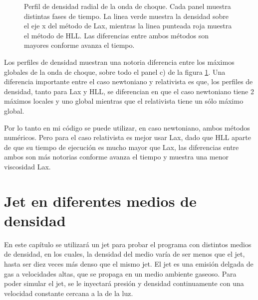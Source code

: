 \documentclass[12pt,a4paper]{book}
\begin{document}
\begin{figure}
\caption{\label{fig:perfil_de_densidad_radial_relativista}Perfil de densidad radial de la onda de choque. Cada panel muestra distintas fases de tiempo. La linea verde muestra la densidad sobre el eje x del método de Lax, mientras la linea punteada roja muestra el método de HLL. Las diferencias entre ambos métodos son mayores conforme avanza el tiempo.}
\end{figure}

Los perfiles de densidad muestran una notoria diferencia entre los máximos globales de la onda de choque, sobre todo el panel c) de la figura \ref{fig:perfil_de_densidad_radial_relativista}. Una diferencia importante entre el caso newtoniano y relativista es que, los perfiles de densidad, tanto para Lax y HLL, se diferencian en que el caso newtoniano tiene 2 máximos locales y uno global mientras que el relativista tiene un sólo máximo global.

Por lo tanto en mi código se puede utilizar, en caso newtoniano, ambos métodos numéricos. Pero para el caso relativista es mejor usar Lax, dado que HLL aparte de que su tiempo de ejecución es mucho mayor que Lax, las diferencias entre ambos son más notorias conforme avanza el tiempo y muestra una menor viscosidad Lax. 




\chapter{Jet en diferentes medios de densidad}

En este capítulo se utilizará un jet para probar el programa con distintos medios de densidad, en los cuales, la densidad del medio varía de ser menos que el jet, hasta ser diez veces más denso que el mismo jet.
El jet  es una emisión delgada de gas a velocidades altas, que se propaga en un medio ambiente gaseoso. Para poder simular el jet, se le inyectará presión y densidad continuamente con una velocidad constante cercana a la de la luz. 
\end{document}
